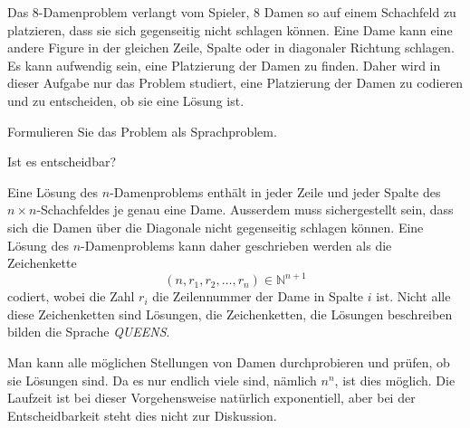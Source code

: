 Das 8-Damenproblem verlangt vom Spieler, 8 Damen so auf einem Schachfeld
zu platzieren, dass sie sich gegenseitig nicht schlagen können.
Eine Dame kann eine andere Figure in der gleichen Zeile, Spalte oder
in diagonaler Richtung schlagen.
Es kann aufwendig sein, eine Platzierung der Damen zu finden.
Daher wird in dieser Aufgabe nur das Problem studiert, eine Platzierung
der Damen zu codieren und zu entscheiden, ob sie eine Lösung ist.
\begin{teilaufgaben}
\item
Formulieren Sie das Problem als Sprachproblem.
\item
Ist es entscheidbar?
\end{teilaufgaben}

\begin{loesung}
\begin{teilaufgaben}
\item
Eine Lösung des $n$-Damenproblems enthält in jeder Zeile und
jeder Spalte des $n\times n$-Schachfeldes je genau eine Dame.
Ausserdem muss sichergestellt sein, dass sich die Damen über
die Diagonale nicht gegenseitig schlagen können.
Eine Lösung des $n$-Damenproblems kann daher geschrieben werden
als die Zeichenkette
\[
(n,r_1,r_2,\dots,r_n) \in \mathbb{N}^{n+1}
\]
codiert, wobei die Zahl $r_i$ die Zeilennummer der Dame in Spalte $i$
ist.
Nicht alle diese Zeichenketten sind Lösungen, die Zeichenketten, die
Lösungen beschreiben bilden die Sprache \textit{QUEENS}.
\item
Man kann alle möglichen Stellungen von Damen durchprobieren und prüfen,
ob sie Lösungen sind.
Da es nur endlich viele sind, nämlich $n^n$, ist dies möglich.
Die Laufzeit ist bei dieser Vorgehensweise natürlich exponentiell, aber
bei der Entscheidbarkeit steht dies nicht zur Diskussion.
\qedhere
\end{teilaufgaben}
\end{loesung}

